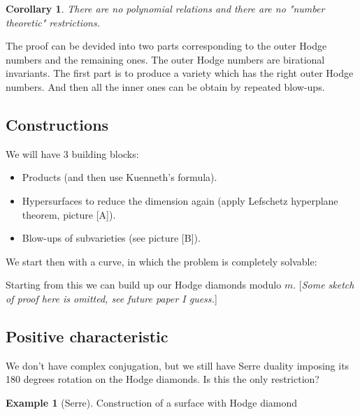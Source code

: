 \documentclass[11pt,A4]{article}
\theoremstyle{plain}
\newtheorem{cor}[thm]{Corollary}
\theoremstyle{definition}
\newtheorem{exa}[thm]{Example}
\theoremstyle{remark}
\newcommand{\1}{\mathbbm{1}}
\begin{document}
\begin{cor}
    There are no polynomial relations and there are no "number theoretic" restrictions.
\end{cor}

The proof can be devided into two parts corresponding to the outer Hodge numbers and the remaining ones.
The outer Hodge numbers are birational invariants.
The first part is to produce a variety which has the right outer Hodge numbers.
And then all the inner ones can be obtain by repeated blow-ups.
    
\subsection{Constructions}

We will have $3$ building blocks:
\begin{itemize}
    \item Products (and then use Kuenneth's formula).
    \item Hypersurfaces to reduce the dimension again (apply Lefschetz hyperplane theorem, picture [A]).
    \item Blow-ups of subvarieties (see picture [B]).
\end{itemize}

We start then with a curve, in which the problem is completely solvable:
\begin{center}
\end{center}

Starting from this we can build up our Hodge diamonds modulo $m$.
[\textit{Some sketch of proof here is omitted, see future paper I guess.}]

\subsection{Positive characteristic}

We don't have complex conjugation, but we still have Serre duality imposing its 180 degrees rotation on the Hodge diamonds.
Is this the only restriction?

\begin{exa}[Serre]
    Construction of a surface with Hodge diamond
    \begin{center}
    \end{center}
\end{exa}
\end{document}
